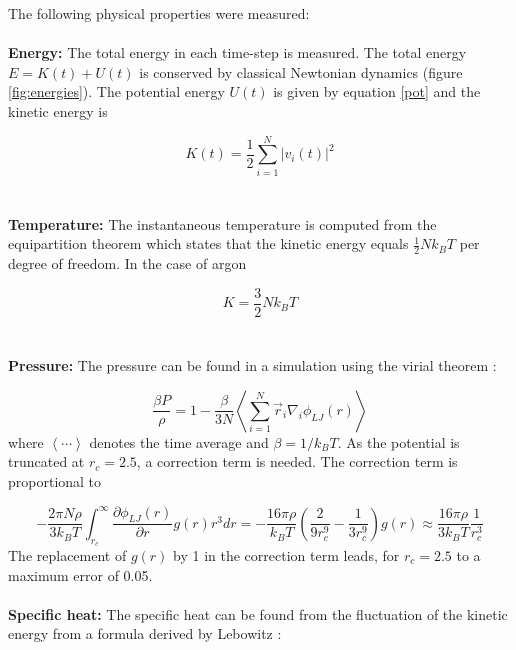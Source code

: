 \documentclass{article}
\begin{document}
The following physical properties were measured:\\ \\

\textbullet \textbf{ Energy: } The total energy in each time-step is measured. The total energy $E=K(t)+U(t)$ is conserved by classical Newtonian dynamics (figure \ref{fig:energies}). The potential energy $U(t)$ is given by equation \ref{pot} and the kinetic energy is

\begin{equation}
 K(t)=\frac12 \sum_{i=1}^N \left| v_i(t) \right|^2
\end{equation} \\ \\


\textbullet \textbf{ Temperature: } The instantaneous temperature is computed from the equipartition theorem which states that the kinetic energy equals $\frac12 N k_B T$ per degree of freedom. In the case of argon

\begin{equation}
 K = \frac32 N k_B T
\end{equation} \\ \\ 


\textbullet \textbf{ Pressure: } The pressure can be found in a simulation using the virial theorem \citep{virial,thijssen2007computational, PhysRev.159.98}:

\begin{equation}
 \frac{\beta P}{\rho}=1-\frac{\beta}{3N}\left\langle \sum_{i=1}^N \vec{r}_i\nabla_i \phi_{LJ}(r) \right\rangle
\end{equation} 
where $\left\langle \cdots \right\rangle$ denotes the time average and $\beta=1/k_B T$. As the potential is truncated at $r_{c}=2.5$, a correction term is needed. The correction term is proportional to

\begin{equation}
-\frac{2\pi N \rho}{3k_BT} \int_{r_{c}}^{\infty} \frac{\partial \phi_{LJ}(r)}{\partial r}g(r)r^3dr=-\frac{16 \pi \rho}{k_B T} \left(  \frac{2}{9r_c^9}-\frac{1}{3r_c^9} \right)g(r) \approx  \frac{16 \pi \rho}{3k_B T} \frac{1}{r_c^3}
\end{equation} 
The replacement of $g(r)$ by 1 in the correction term leads, for $r_c=2.5$ to a maximum error of 0.05. \\ \\

\textbullet \textbf{ Specific heat: } The specific heat can be found from the fluctuation of the kinetic energy from a formula derived by Lebowitz \citep{thijssen2007computational, Lebowitz1967250}:
\end{document}
